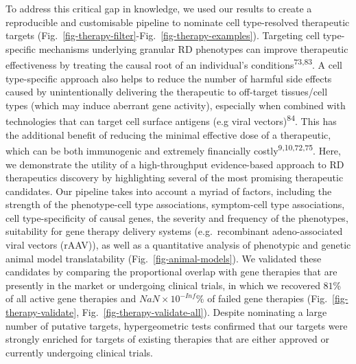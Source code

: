 \documentclass[
]{article}
\begin{document}
To address this critical gap in knowledge, we used our results to create
a reproducible and customisable pipeline to nominate cell type-resolved
therapeutic targets
(Fig.~\ref{fig-therapy-filter}-Fig.~\ref{fig-therapy-examples}).
Targeting cell type-specific mechanisms underlying granular RD
phenotypes can improve therapeutic effectiveness by treating the causal
root of an individual's conditions\textsuperscript{73,83}. A cell
type-specific approach also helps to reduce the number of harmful side
effects caused by unintentionally delivering the therapeutic to
off-target tissues/cell types (which may induce aberrant gene activity),
especially when combined with technologies that can target cell surface
antigens (e.g viral vectors)\textsuperscript{84}. This has the
additional benefit of reducing the minimal effective dose of a
therapeutic, which can be both immunogenic and extremely financially
costly\textsuperscript{9,10,72,75}. Here, we demonstrate the utility of
a high-throughput evidence-based approach to RD therapeutics discovery
by highlighting several of the most promising therapeutic candidates.
Our pipeline takes into account a myriad of factors, including the
strength of the phenotype-cell type associations, symptom-cell type
associations, cell type-specificity of causal genes, the severity and
frequency of the phenotypes, suitability for gene therapy delivery
systems (e.g.~recombinant adeno-associated viral vectors (rAAV)), as
well as a quantitative analysis of phenotypic and genetic animal model
translatability (Fig.~\ref{fig-animal-models}). We validated these
candidates by comparing the proportional overlap with gene therapies
that are presently in the market or undergoing clinical trials, in which
we recovered \(81\)\% of all active gene therapies and
\(NaN \times 10^{-Inf}\)\% of failed gene therapies
(Fig.~\ref{fig-therapy-validate}, Fig.~\ref{fig-therapy-validate-all}).
Despite nominating a large number of putative targets, hypergeometric
tests confirmed that our targets were strongly enriched for targets of
existing therapies that are either approved or currently undergoing
clinical trials.
\end{document}
